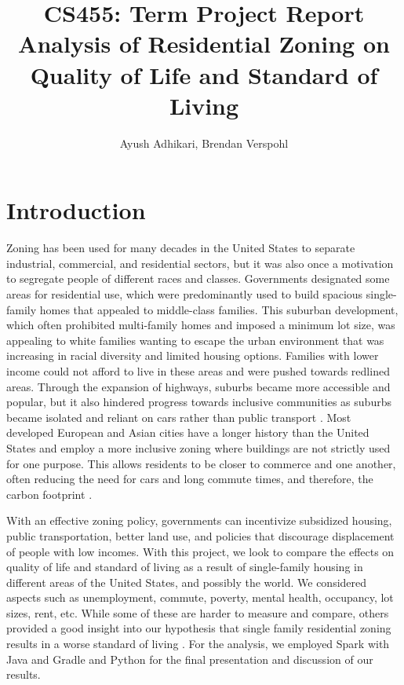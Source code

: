 \documentclass[titlepage]{article}
\begin{document}
\title{
  CS455: Term Project Report\\
  \large Analysis of Residential Zoning on\\
    Quality of Life and Standard of Living}

\author{Ayush Adhikari, Brendan Verspohl}

\maketitle

\section{Introduction}
Zoning has been used for many decades in the United States to separate industrial, commercial, and residential sectors, but it was also once a motivation to segregate people of different races and classes. Governments designated some areas for residential use, which were predominantly used to build spacious single-family homes that appealed to middle-class families. This suburban development, which often prohibited multi-family homes and imposed a minimum lot size, was appealing to white families wanting to escape the urban environment that was increasing in racial diversity and limited housing options. Families with lower income could not afford to live in these areas and were pushed towards redlined areas. Through the expansion of highways, suburbs became more accessible and popular, but it also hindered progress towards inclusive communities as suburbs became isolated and reliant on cars rather than public transport \cite{freemark}. Most developed European and Asian cities have a longer history than the United States and employ a more inclusive zoning where buildings are not strictly used for one purpose. This allows residents to be closer to commerce and one another, often reducing the need for cars and long commute times, and therefore, the carbon footprint \cite{romem}. 

With an effective zoning policy, governments can incentivize subsidized housing, public transportation, better land use, and policies that discourage displacement of people with low incomes. With this project, we look to compare the effects on quality of life and standard of living as a result of single-family housing in different areas of the United States, and possibly the world. We considered aspects such as unemployment, commute, poverty, mental health, occupancy, lot sizes, rent, etc. While some of these are harder to measure and compare, others provided a good insight into our hypothesis that single family residential zoning results in a worse standard of living \cite{uscensus}. For the analysis, we employed Spark with Java and Gradle and Python for the final presentation and discussion of our results. 
\end{document}
